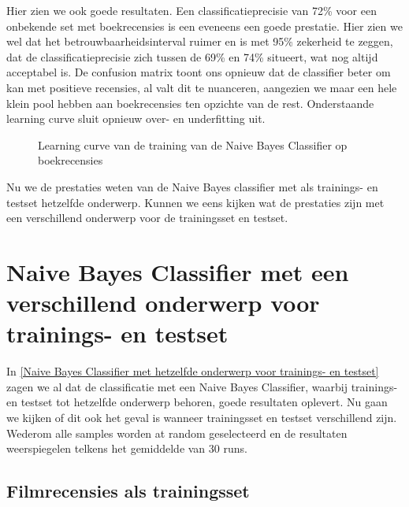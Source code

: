 \begin{appendices}
Hier zien we ook goede resultaten. Een classificatieprecisie van 72\% voor een onbekende set met boekrecensies is een eveneens een goede prestatie. Hier zien we wel dat het betrouwbaarheidsinterval ruimer en is met 95\% zekerheid te zeggen, dat de classificatieprecisie zich tussen de 69\% en 74\% situeert, wat nog altijd acceptabel is. De confusion matrix toont ons opnieuw dat de classifier beter om kan met positieve recensies, al valt dit te nuanceren, aangezien we maar een hele klein pool hebben aan boekrecensies ten opzichte van de rest. Onderstaande learning curve sluit opnieuw over- en underfitting uit.\\
\newpage
\begin{figure}%
    \centering
    \label{fig:lc-boek-boek}
    \caption{Learning curve van de training van de Naive Bayes Classifier op boekrecensies}
\end{figure}

Nu we de prestaties weten van de Naive Bayes classifier met als trainings- en testset hetzelfde onderwerp. Kunnen we eens kijken wat de prestaties zijn met een verschillend onderwerp voor de trainingsset en testset.  

\section{Naive Bayes Classifier met een verschillend onderwerp voor trainings- en testset}\label{Naive Bayes Classifier met verschillend onderwerp voor trainings- en testset}

In \ref{Naive Bayes Classifier met hetzelfde onderwerp voor trainings- en testset} zagen we al dat de classificatie met een Naive Bayes Classifier, waarbij trainings- en testset tot hetzelfde onderwerp behoren, goede resultaten oplevert. Nu gaan we kijken of dit ook het geval is wanneer trainingsset en testset verschillend zijn. Wederom alle samples worden at random geselecteerd en de resultaten weerspiegelen telkens het gemiddelde van 30 runs.  

\subsection{Filmrecensies als trainingsset}\label{Filmrecensies als trainingsset}


\end{appendices}
